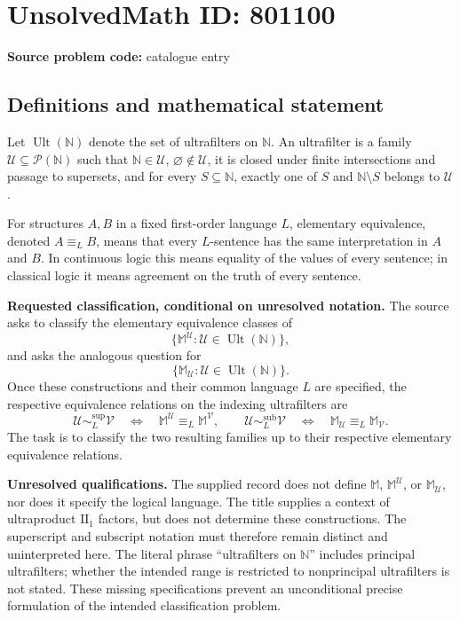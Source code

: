 \documentclass[11pt]{article}
\newcommand{\N}{\mathbb{N}}
\begin{document}
\section*{UnsolvedMath ID: 801100}
\textbf{Source problem code:} catalogue entry
\subsection{Definitions and mathematical statement}
Let \(\operatorname{Ult}(\N)\) denote the set of ultrafilters on \(\N\). An ultrafilter is a family \(\mathcal U\subseteq\mathcal P(\N)\) such that \(\N\in\mathcal U\), \(\varnothing\notin\mathcal U\), it is closed under finite intersections and passage to supersets, and for every \(S\subseteq\N\), exactly one of \(S\) and \(\N\setminus S\) belongs to \(\mathcal U\).

For structures \(A,B\) in a fixed first-order language \(L\), elementary equivalence, denoted \(A\equiv_L B\), means that every \(L\)-sentence has the same interpretation in \(A\) and \(B\). In continuous logic this means equality of the values of every sentence; in classical logic it means agreement on the truth of every sentence.

\textbf{Requested classification, conditional on unresolved notation.} The source asks to classify the elementary equivalence classes of
\[
\bigl\{\mathbb M^{\mathcal U}:\mathcal U\in\operatorname{Ult}(\N)\bigr\},
\]
and asks the analogous question for
\[
\bigl\{\mathbb M_{\mathcal U}:\mathcal U\in\operatorname{Ult}(\N)\bigr\}.
\]
Once these constructions and their common language \(L\) are specified, the respective equivalence relations on the indexing ultrafilters are
\[
\mathcal U\sim^{\mathrm{sup}}_L\mathcal V
\quad\Longleftrightarrow\quad
\mathbb M^{\mathcal U}\equiv_L\mathbb M^{\mathcal V},
\qquad
\mathcal U\sim^{\mathrm{sub}}_L\mathcal V
\quad\Longleftrightarrow\quad
\mathbb M_{\mathcal U}\equiv_L\mathbb M_{\mathcal V}.
\]
The task is to classify the two resulting families up to their respective elementary equivalence relations.

\textbf{Unresolved qualifications.} The supplied record does not define \(\mathbb M\), \(\mathbb M^{\mathcal U}\), or \(\mathbb M_{\mathcal U}\), nor does it specify the logical language. The title supplies a context of ultraproduct \(\mathrm{II}_1\) factors, but does not determine these constructions. The superscript and subscript notation must therefore remain distinct and uninterpreted here. The literal phrase ``ultrafilters on \(\N\)'' includes principal ultrafilters; whether the intended range is restricted to nonprincipal ultrafilters is not stated. These missing specifications prevent an unconditional precise formulation of the intended classification problem.
\end{document}
